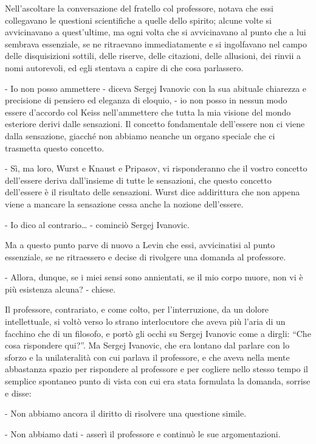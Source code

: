 Nell'ascoltare la conversazione del fratello col professore, notava che essi collegavano le questioni scientifiche a quelle dello spirito; alcune volte si avvicinavano a quest'ultime, ma ogni volta che si avvicinavano al punto che a lui sembrava essenziale, se ne ritraevano immediatamente e si ingolfavano nel campo delle disquisizioni sottili, delle riserve, delle citazioni, delle allusioni, dei rinvii a nomi autorevoli, ed egli stentava a capire di che cosa parlassero. 

- Io non posso ammettere - diceva Sergej Ivanovic con la sua abituale chiarezza e precisione di pensiero ed eleganza di eloquio, - io non posso in nessun modo essere d'accordo col Keiss nell'ammettere che tutta la mia visione del mondo esteriore derivi dalle sensazioni. Il concetto fondamentale dell'essere non ci viene dalla sensazione, giacché non abbiamo neanche un organo speciale che ci trasmetta questo concetto. 

- Sì, ma loro, Wurst e Knaust e Pripasov, vi risponderanno che il vostro concetto dell'essere deriva dall'insieme di tutte le sensazioni, che questo concetto dell'essere è il risultato delle sensazioni. Wurst dice addirittura che non appena viene a mancare la sensazione cessa anche la nozione dell'essere. 

- Io dico al contrario\ldots{} - cominciò Sergej Ivanovic. 

Ma a questo punto parve di nuovo a Levin che essi, avvicinatisi al punto essenziale, se ne ritraessero e decise di rivolgere una domanda al professore. 

- Allora, dunque, se i miei sensi sono annientati, se il mio corpo muore, non vi è più esistenza alcuna? - chiese. 

Il professore, contrariato, e come colto, per l'interruzione, da un dolore intellettuale, si voltò verso lo strano interlocutore che aveva più l'aria di un facchino che di un filosofo, e portò gli occhi su Sergej Ivanovic come a dirgli: ``Che cosa rispondere qui?''. Ma Sergej Ivanovic, che era lontano dal parlare con lo sforzo e la unilateralità con cui parlava il professore, e che aveva nella mente abbastanza spazio per rispondere al professore e per cogliere nello stesso tempo il semplice spontaneo punto di vista con cui era stata formulata la domanda, sorrise e disse: 

- Non abbiamo ancora il diritto di risolvere una questione simile. 

- Non abbiamo dati - asserì il professore e continuò le sue argomentazioni. 

